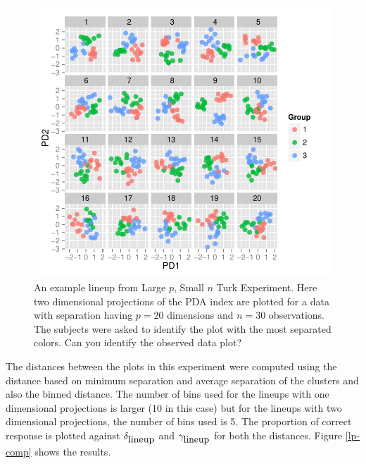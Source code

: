 \documentclass[12]{article}
\begin{document}
\begin{figure}[htbp]
\centering
\includegraphics[width=.7\textwidth]{largep-example.pdf}
\caption{An example lineup from Large $p$, Small $n$ Turk Experiment. Here two dimensional projections of the PDA index are plotted for a data with separation having $p = 20$ dimensions and $n = 30$ observations. The subjects were asked to identify the plot with the most separated colors. Can you identify the observed data plot?}
\label{largep}
\end{figure}

The distances between the plots in this experiment were computed using the distance based on minimum separation and average separation of the clusters and also the binned distance. The number of bins used for the lineups with one dimensional projections is larger (10 in this case) but for the lineups with two dimensional projections, the number of bins used is 5. The proportion of correct response is plotted against $\delta_{\hbox{lineup}}$ and $\gamma_{\hbox{lineup}}$ for both the distances. Figure \ref{lp-comp} shows the results.
\end{document}
